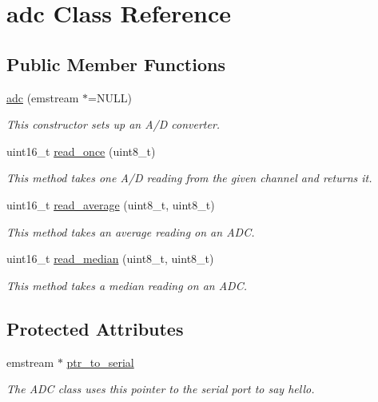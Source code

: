 \hypertarget{classadc}{\section{adc \-Class \-Reference}
\label{classadc}
}
\subsection*{\-Public \-Member \-Functions}
\begin{DoxyCompactItemize}
\item 
\hyperlink{classadc_af3b8262c08f5fc5ae325a20622883424}{adc} (emstream $\ast$=\-N\-U\-L\-L)
\begin{DoxyCompactList}\small\item\em \-This constructor sets up an \-A/\-D converter. \end{DoxyCompactList}\item 
uint16\-\_\-t \hyperlink{classadc_a2190a59696a7093e1ea605e998ccf97e}{read\-\_\-once} (uint8\-\_\-t)
\begin{DoxyCompactList}\small\item\em \-This method takes one \-A/\-D reading from the given channel and returns it. \end{DoxyCompactList}\item 
uint16\-\_\-t \hyperlink{classadc_a78ce9328800df2bceb1cbc07f0270bb8}{read\-\_\-average} (uint8\-\_\-t, uint8\-\_\-t)
\begin{DoxyCompactList}\small\item\em \-This method takes an average reading on an \-A\-D\-C. \end{DoxyCompactList}\item 
uint16\-\_\-t \hyperlink{classadc_a177ab41dc528c2beb60bcef17ee6f483}{read\-\_\-median} (uint8\-\_\-t, uint8\-\_\-t)
\begin{DoxyCompactList}\small\item\em \-This method takes a median reading on an \-A\-D\-C. \end{DoxyCompactList}\end{DoxyCompactItemize}
\subsection*{\-Protected \-Attributes}
\begin{DoxyCompactItemize}
\item 
\hypertarget{classadc_a14680b48b723bf1adddd2741ebb18a3e}{emstream $\ast$ \hyperlink{classadc_a14680b48b723bf1adddd2741ebb18a3e}{ptr\-\_\-to\-\_\-serial}}\label{classadc_a14680b48b723bf1adddd2741ebb18a3e}

\begin{DoxyCompactList}\small\item\em \-The \-A\-D\-C class uses this pointer to the serial port to say hello. \end{DoxyCompactList}\end{DoxyCompactItemize}


